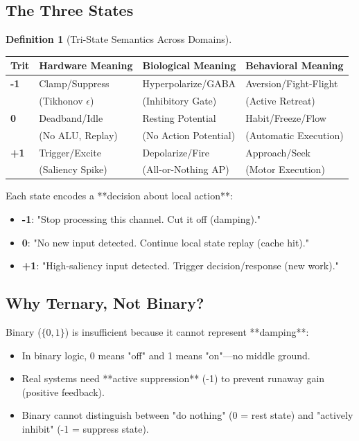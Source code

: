 \documentclass[11pt,oneside]{article}
\theoremstyle{definition}
\newtheorem{definition}[theorem]{Definition}
\begin{document}
\subsection{The Three States}

\begin{definition}[Tri-State Semantics Across Domains]

\begin{center}
\begin{tabular}{llll}
\toprule
Trit & Hardware Meaning & Biological Meaning & Behavioral Meaning \\
\midrule
\textbf{-1} & Clamp/Suppress & Hyperpolarize/GABA & Aversion/Fight-Flight \\
& (Tikhonov $\epsilon$) & (Inhibitory Gate) & (Active Retreat) \\
\midrule
\textbf{0} & Deadband/Idle & Resting Potential & Habit/Freeze/Flow \\
& (No ALU, Replay) & (No Action Potential) & (Automatic Execution) \\
\midrule
\textbf{+1} & Trigger/Excite & Depolarize/Fire & Approach/Seek \\
& (Saliency Spike) & (All-or-Nothing AP) & (Motor Execution) \\
\toprule
\end{tabular}
\end{center}

Each state encodes a **decision about local action**:

\begin{itemize}
  \item \textbf{-1}: "Stop processing this channel. Cut it off (damping)."
  \item \textbf{0}: "No new input detected. Continue local state replay (cache hit)."
  \item \textbf{+1}: "High-saliency input detected. Trigger decision/response (new work)."
\end{itemize}
\end{definition}

\subsection{Why Ternary, Not Binary?}

Binary ($\{0, 1\}$) is insufficient because it cannot represent **damping**:

\begin{itemize}
  \item In binary logic, 0 means "off" and 1 means "on"—no middle ground.
  \item Real systems need **active suppression** (-1) to prevent runaway gain (positive feedback).
  \item Binary cannot distinguish between "do nothing" (0 = rest state) and "actively inhibit" (-1 = suppress state).
\end{itemize}
\end{document}
